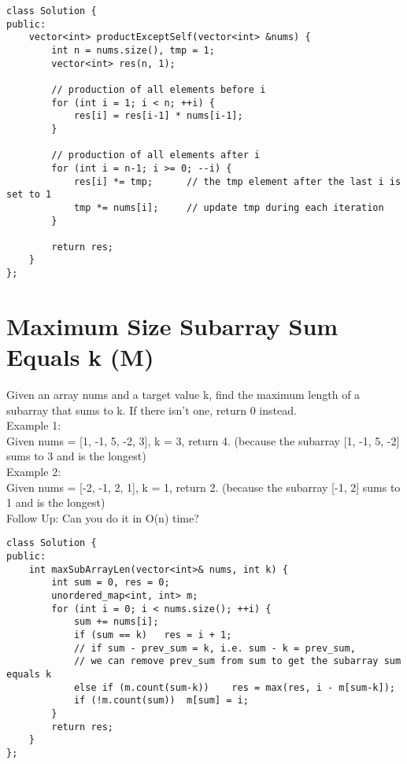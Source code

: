 \begin{lstlisting}
class Solution {
public:
    vector<int> productExceptSelf(vector<int> &nums) {
        int n = nums.size(), tmp = 1;
        vector<int> res(n, 1);
        
        // production of all elements before i
        for (int i = 1; i < n; ++i) {
            res[i] = res[i-1] * nums[i-1];
        }
        
        // production of all elements after i
        for (int i = n-1; i >= 0; --i) {
            res[i] *= tmp;      // the tmp element after the last i is set to 1
            tmp *= nums[i];     // update tmp during each iteration
        }
        
        return res;
    }
};
\end{lstlisting}


\section{Maximum Size Subarray Sum Equals k (M)}
Given an array nums and a target value k, find the maximum length of a subarray that sums to k. If there isn't one, return 0 instead.\\

Example 1:\\
Given nums = [1, -1, 5, -2, 3], k = 3, return 4. (because the subarray [1, -1, 5, -2] sums to 3 and is the longest)\\

Example 2: \\
Given nums = [-2, -1, 2, 1], k = 1, return 2. (because the subarray [-1, 2] sums to 1 and is the longest) \\

Follow Up:
Can you do it in O(n) time? \\

\begin{lstlisting}
class Solution {
public:
    int maxSubArrayLen(vector<int>& nums, int k) {
        int sum = 0, res = 0;
        unordered_map<int, int> m;
        for (int i = 0; i < nums.size(); ++i) {
            sum += nums[i];
            if (sum == k)   res = i + 1;
            // if sum - prev_sum = k, i.e. sum - k = prev_sum,
            // we can remove prev_sum from sum to get the subarray sum equals k
            else if (m.count(sum-k))    res = max(res, i - m[sum-k]);
            if (!m.count(sum))  m[sum] = i;
        }
        return res;
    }
};
\end{lstlisting}


